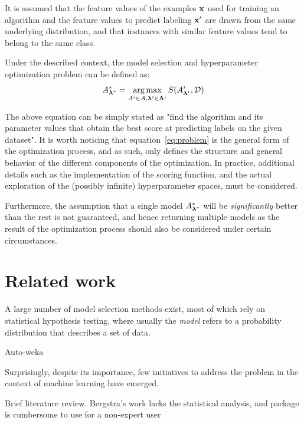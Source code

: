 	It is assumed that the feature values of the examples $\mathbf{x}$ used for training an algorithm
	and the feature values to predict labeling $\mathbf{x}'$ are drawn from the same underlying
	distribution, and that instances with similar feature values tend to belong to the same class.

	Under the described context, the model selection and hyperparameter optimization problem can be
	defined as:
	\begin{equation}
		\label{eq:problem}
		A^*_{\boldsymbol{\lambda}^*} = \operatorname*{arg\,max}_{A^i \in \mathcal{A}, \boldsymbol{\lambda}^i \in \mathbf{\Lambda}^i}
		S(A^i_{\boldsymbol{\lambda}^i}, \mathcal{D})
	\end{equation}

	The above equation can be simply stated as "find the algorithm and its parameter values that
	obtain the best score at predicting labels on the given dataset". It is worth noticing that
	equation~\ref{eq:problem} is the general form of the optimization process, and as such, only
	defines the structure and general behavior of the different components of the optimization. In
	practice, additional details such as the implementation of the scoring function, and the actual
	exploration of the (possibly infinite) hyperparameter spaces, must be considered.

	Furthermore, the assumption that a single model $A^*_{\boldsymbol{\lambda}^*}$ will be \emph{significantly} better than the
	rest is not guaranteed, and hence returning multiple models as the result of the
	optimization process should also be considered under certain circumstances.

	\section{Related work}

	A large number of model selection methods exist, most of which rely on statistical hypothesis
	testing, where usually the \emph{model} refers to a probability distribution that describes a
	set of data.

	Auto-weka
	
	Surprisingly, despite its importance, few initiatives to address the problem in the context of
	machine learning have emerged.

	Brief literature review. Bergstra's work \cite{bergstra2011hyperparameter} lacks the statistical
	analysis, and package is cumbersome to use for a non-expert user
